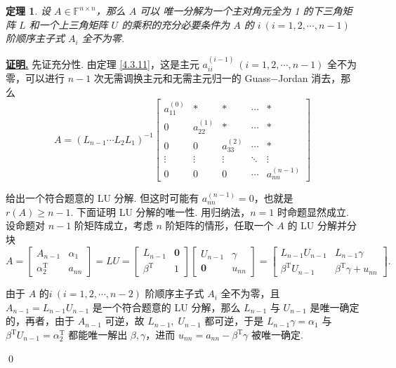 \documentclass[10pt,openany]{article}
\theoremstyle{thmstyle} %
\newtheorem{theorem}{定理}[subsection]
\theoremstyle{defstyle} %
\theoremstyle{prostyle} %
\theoremstyle{exastyle}
\theoremstyle{remstyle}
\renewenvironment{proof}[1][证明]{\par\underline{\textbf{#1.}} \;\fangsong}{\qed\par}
\newcommand{\T}{^{\text{T}}}
\newcommand{\F}{\mathbb{F}}
\newcommand{\n}{^{n \times n}}
\begin{document}
\begin{theorem} \label{4.3.12}
	设 \( A \in \F\n \)，那么 \( A \) 可以{\color{blue} 唯一分解}为一个主对角元全为 1 的下三角矩阵 \( L \) 和一个上三角矩阵 \( U \) 的乘积的充分必要条件为 \( A \) 的 \( i \ (i=1,2,\cdots,n-1) \) 阶顺序主子式 \( A_i \) 全不为零.
\end{theorem}

\begin{proof}
	先证充分性. 由定理 \ref{4.3.11}，这是主元 \( a_{ii}^{(i-1)} \ (i=1,2,\cdots,n-1) \) 全不为零，可以进行  \( n-1 \) 次无需调换主元和无需主元归一的 Guass\(-\)Jordan 消去，那么
	\[ A= (L_{n-1}\cdots L_2L_1)^{-1}\begin{bmatrix}
		a_{11}^{(0)} & * & * & \cdots & * \\[1ex]
		0 & a_{22}^{(1)} & * & \cdots & * \\[1ex]
		0 & 0 & a_{33}^{(2)} & \cdots & * \\[1ex]
		\vdots & \vdots & \vdots & \ddots & \vdots \\[1ex]
		0 & 0 & 0 & \cdots & a_{nn}^{(n-1)}
	\end{bmatrix} \]
	
	给出一个符合题意的 LU 分解. 但这时可能有 \( a_{nn}^{(n-1)}=0 \)，也就是 \( r(A) \geq n-1 \). 下面证明 LU 分解的唯一性. 用归纳法，\( n=1 \) 时命题显然成立. 设命题对 \( n-1 \) 阶矩阵成立，考虑 \( n \) 阶矩阵的情形，任取一个 \( A \) 的 LU 分解并分块
	\[ A=\begin{bmatrix}
		A_{n-1} & \alpha_1 \\
		\alpha_2\T & a_{nn}
	\end{bmatrix}=LU=\begin{bmatrix}
	 L_{n-1} & \bm{0} \\
	 \beta\T & 1
	\end{bmatrix}\begin{bmatrix}
	 U_{n-1} & \gamma \\
	 \bm{0} & u_{nn}
	\end{bmatrix}=\begin{bmatrix}
	L_{n-1}U_{n-1} & L_{n-1}\gamma \\
	\beta\T U_{n-1} & \beta\T \gamma+u_{nn}
	\end{bmatrix}. \]
	
	由于 \( A \) 的\( i \ (i=1,2,\cdots,n-2) \) 阶顺序主子式 \( A_i \) 全不为零，且 \( A_{n-1}=L_{n-1}U_{n-1} \) 是一个符合题意的 LU 分解，那么 \( L_{n-1} \) 与 \( U_{n-1} \) 是唯一确定的，再者，由于 \( A_{n-1} \) 可逆，故 \( L_{n-1}, \; U_{n-1} \) 都可逆，于是 \( L_{n-1}\gamma=\alpha_1 \) 与 \( \beta\T U_{n-1}=\alpha_2\T \) 都能唯一解出 \( \beta, \gamma \)，进而 \( u_{nn}=a_{nn}-\beta\T \gamma \) 被唯一确定.
	

\end{proof}
\end{document}
